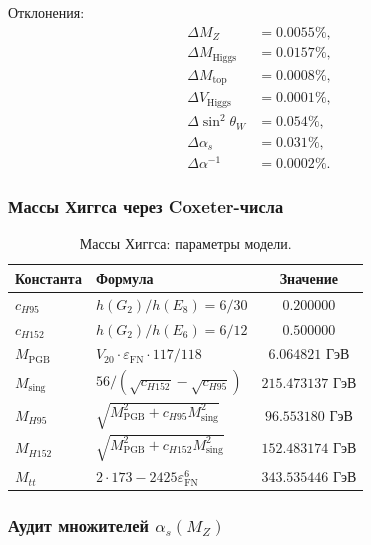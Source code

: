 \documentclass[11pt,a4paper]{article}
\theoremstyle{definition}
\begin{document}
\medskip\noindent
Отклонения:
\begin{align}
    \Delta M_Z &= 0.0055\%, \\
    \Delta M_{\text{Higgs}} &= 0.0157\%, \\
    \Delta M_{\text{top}} &= 0.0008\%, \\
    \Delta V_{\text{Higgs}} &= 0.0001\%, \\
    \Delta \sin^2\theta_W &= 0.054\%, \\
    \Delta \alpha_s &= 0.031\%, \\
    \Delta \alpha^{-1} &= 0.0002\%.
\end{align}

\subsubsection{Массы Хиггса через Coxeter-числа}

\begin{table}[ht]
\centering
\caption{Массы Хиггса: параметры модели.}
\label{tab:app-higgs}
\begin{tabular}{llc}
\toprule
Константа & Формула & Значение \\
\midrule
$c_{H95}$ & $h(G_2)/h(E_8) = 6/30$ & $0.200000$ \\
$c_{H152}$ & $h(G_2)/h(E_6) = 6/12$ & $0.500000$ \\
$M_{\text{PGB}}$ & $V_{20} \cdot \varepsilon_{\text{FN}} \cdot 117/118$ & $6.064821$ ГэВ \\
$M_{\text{sing}}$ & $56/(\sqrt{c_{H152}} - \sqrt{c_{H95}})$ & $215.473137$ ГэВ \\
$M_{H95}$ & $\sqrt{M_{\text{PGB}}^2 + c_{H95} M_{\text{sing}}^2}$ & $96.553180$ ГэВ \\
$M_{H152}$ & $\sqrt{M_{\text{PGB}}^2 + c_{H152} M_{\text{sing}}^2}$ & $152.483174$ ГэВ \\
$M_{tt}$ & $2 \cdot 173 - 2425 \varepsilon_{\text{FN}}^6$ & $343.535446$ ГэВ \\
\bottomrule
\end{tabular}
\end{table}

\subsubsection{Аудит множителей \texorpdfstring{$\alpha_s(M_Z)$}{alpha\_s(M\_Z)}}
\end{document}
